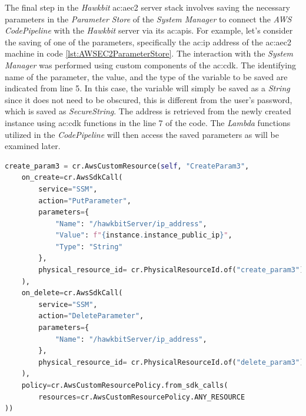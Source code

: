 The final step in the \textit{Hawkbit} \gls{ac:aec2} server stack involves saving the necessary parameters in the \textit{Parameter Store} of the \textit{System Manager} to connect the \textit{AWS CodePipeline} with the \textit{Hawkbit} server via its \gls{ac:api}s. For example, let's consider the saving of one of the parameters, specifically the \gls{ac:ip} address of the \gls{ac:aec2} machine in code \ref{lst:AWSEC2ParameterStore}. The interaction with the \textit{System Manager} was performed using custom components of the \gls{ac:cdk}. The identifying name of the parameter, the value, and the type of the variable to be saved are indicated from line 5. In this case, the variable will simply be saved as a \textit{String} since it does not need to be obscured, this is different from the user's password, which is saved as \textit{SecureString}. The address is retrieved from the newly created instance using \gls{ac:cdk} functions in the line 7 of the code. The \textit{Lambda} functions utilized in the \textit{CodePipeline} will then access the saved parameters as will be examined later.
\begin{lstlisting}[language=Python, caption={Hawkbit server Docker compose}, label=lst:AWSEC2ParameterStore]
    create_param3 = cr.AwsCustomResource(self, "CreateParam3",
    on_create=cr.AwsSdkCall(
        service="SSM",
        action="PutParameter",
        parameters={
            "Name": "/hawkbitServer/ip_address",
            "Value": f"{instance.instance_public_ip}",
            "Type": "String"
        },
        physical_resource_id= cr.PhysicalResourceId.of("create_param3")
    ),
    on_delete=cr.AwsSdkCall(
        service="SSM",
        action="DeleteParameter",
        parameters={
            "Name": "/hawkbitServer/ip_address",
        },
        physical_resource_id= cr.PhysicalResourceId.of("delete_param3")
    ),
    policy=cr.AwsCustomResourcePolicy.from_sdk_calls(
        resources=cr.AwsCustomResourcePolicy.ANY_RESOURCE
))
\end{lstlisting}

